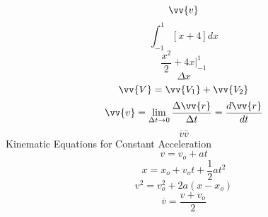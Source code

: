 \documentclass[12pt,a4paper,english]{article}
\begin{document}
\begin{flushleft}
\[ \vv{v} \]
\[
    \int_{-1}^1
    [x+4 ]dx
\]
\[ \frac{x^2}{2}+4x\Biggr\rvert_{-1}^1 \]
\[ \Delta x \]
\[\vv{V}=\vv{V_{1}}+\vv{V_{2}}\]
\[
    \vv{v} = \lim_{\Delta t \to 0} \frac{\Delta \vv{r}}{\Delta t}
    =\frac{d\vv{r}}{dt}
\]
\[
  \overline{v}
  \bar{v}
\]
Kinematic Equations for Constant Acceleration
\[ v=v_{o}+at
\]
\[ x=x_{o}+v_{o}t + \frac{1}{2}at^2
\]
\[ v^2=v_{o}^2+2a(x-x_{o})
\]
\[\overline{v}=\frac{v+v_{o}}{2}
\]
\end{flushleft}
\end{document}
